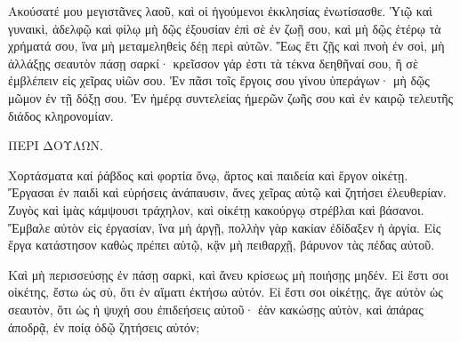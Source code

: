 {Ακούσατέ μου μεγιστᾶνες λαοῦ, καὶ οἱ ἡγούμενοι ἐκκλησίας ἐνωτίσασθε.
Ὑιῷ καὶ γυναικὶ, ἀδελφῷ καὶ φίλῳ μὴ δῷς ἐξουσίαν ἐπὶ σὲ ἐν ζωῇ σου, καὶ μὴ δῷς ἑτέρῳ τὰ χρήματά σου, ἵνα μὴ μεταμεληθεὶς δέῃ περὶ αὐτῶν.
Ἕως ἔτι ζῇς καὶ πνοὴ ἐν σοὶ, μὴ ἀλλάξῃς σεαυτὸν πάσῃ σαρκί·
κρεῖσσον γάρ ἐστι τὰ τέκνα δεηθῆναί σου, ἢ σὲ ἐμβλέπειν εἰς χεῖρας υἱῶν σου.
Ἐν πᾶσι τοῖς ἔργοις σου γίνου ὑπεράγων· μὴ δῷς μῶμον ἐν τῇ δόξῃ σου.
Ἐν ἡμέρᾳ συντελείας ἡμερῶν ζωῆς σου καὶ ἐν καιρῷ τελευτῆς διάδος κληρονομίαν.
\par }{\PP ΠΕΡΙ ΔΟΥΛΩΝ.
\par }{\PP {}Χορτάσματα καί ῥάβδος καὶ φορτία ὄνῳ, ἄρτος καὶ παιδεία καὶ ἔργον οἱκέτῃ.
Ἔργασαι ἐν παιδὶ καὶ εὑρήσεις ἀνάπαυσιν, ἄνες χεῖρας αὐτῷ καὶ ζητήσει ἐλευθερίαν.
Ζυγὸς καὶ ἱμὰς κάμψουσι τράχηλον, καὶ οἰκέτῃ κακούργῳ στρέβλαι καὶ βάσανοι.
Ἔμβαλε αὐτὸν εἰς ἐργασίαν, ἵνα μὴ ἀργῇ, πολλὴν γὰρ κακίαν ἐδίδαξεν ἡ ἀργία.
Εἰς ἔργα κατάστησον καθὼς πρέπει αὐτῷ, κᾂν μὴ πειθαρχῇ, βάρυνον τὰς πέδας αὐτοῦ.
\par }{\PP {}Καὶ μὴ περισσεύσῃς ἐν πάσῃ σαρκὶ, καὶ ἄνευ κρίσεως μὴ ποιήσῃς μηδέν.
Εἰ ἔστι σοι οἰκέτης, ἔστω ὡς σὺ, ὅτι ἐν αἵματι ἐκτήσω αὐτόν.
Εἰ ἔστι σοι οἰκέτῃς, ἄγε αὐτὸν ὡς σεαυτὸν, ὅτι ὡς ἡ ψυχή σου ἐπιδεήσεις αὐτοῦ· ἐὰν κακώσῃς αὐτὸν, καὶ ἀπάρας ἀποδρᾷ, ἐν ποίᾳ ὁδῷ ζητήσεις αὐτόν;

}
